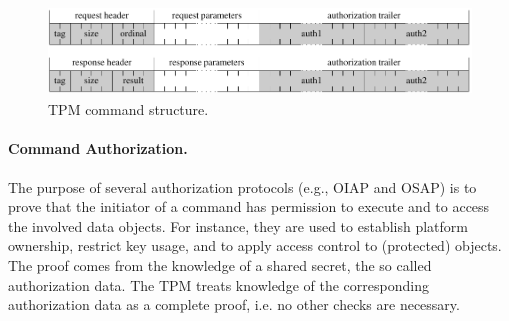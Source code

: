 \documentclass[runningheads]{llncs}
\begin{document}
\begin{figure}
	\begin{center}
		\includegraphics[height=24mm]{figures/tpm_command_structure}
		\caption{TPM command structure.}
		\label{fig:tpm_command}
	\end{center}
\end{figure}

\paragraph{Command Authorization.}
The purpose of several authorization protocols (e.g., OIAP and OSAP) is to
prove that the initiator of a command has permission to execute and to
access the involved data objects. For instance, they are used to establish
platform ownership, restrict key usage, and to apply access control to
(protected) objects. The proof comes from the knowledge of a shared secret,
the so called authorization data. The TPM treats knowledge of the corresponding
authorization data as a complete proof, i.e. no other checks are necessary.

%
\end{document}
